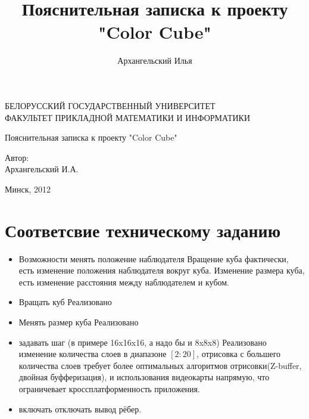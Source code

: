\documentclass[a4paper,11pt]{article}
\title{Пояснительная записка к проекту "Color Cube"}
\author{Архангельский Илья}
\begin{document}
  \begin{titlepage}
   \begin{center}
		БЕЛОРУССКИЙ ГОСУДАРСТВЕННЫЙ УНИВЕРСИТЕТ \\
		ФАКУЛЬТЕТ ПРИКЛАДНОЙ МАТЕМАТИКИ И ИНФОРМАТИКИ
	\end{center}
	\vspace{10em}
	\begin{center}
		\LARGE {Пояснительная записка к проекту "Color Cube"}
		\linebreak	 
		
    
	\end{center}
	\vspace{3em}
	\begin{flushright}
	  
	
 	Автор: \\	Архангельский И.А. \\ 
 	
 	  \vspace{1em}
 	
 	  
 	
	\end{flushright}
	
	\vfill
	\begin{center}
		Минск, 2012
	\end{center}
  \end{titlepage}
  \tableofcontents
  \newpage
  \part{Соответсвие техническому заданию}
  \begin{itemize}
    \item Возможности менять положение наблюдателя 
    \newline
     Вращение куба фактически, есть изменение положения наблюдателя вокруг куба. Изменение размера куба, есть изменение расстояния между наблюдателем и кубом.
    \item Вращать куб  
        \newline
      Реализовано
    \item Менять размер куба 
        \newline
      Реализовано 
    \item  задавать шаг (в примере 16x16x16, а надо бы и 8x8x8) 
        \newline
      Реализовано изменение количества слоев в диапазоне $[2:20]$, отрисовка с большего количества слоев требует более оптимальных алгоритмов отрисовки(Z-buffer, двойная буфферизация), и использования видеокарты напрямую, что ограничевает кроссплатформенность приложения. 
    \item включать отключать вывод рёбер.  
        \newline
        
  \end{itemize} 
  
\end{document}
